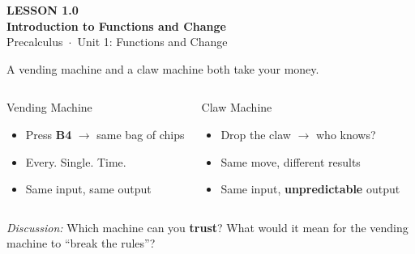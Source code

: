 \documentclass[aspectratio=169, 11pt]{beamer}
\begin{document}
{
\begin{frame}[plain]
  \vspace{2.8cm}\hspace{0.55cm}%
  \begin{minipage}{0.9\textwidth}
    {\color{goldacc}\bfseries\small LESSON 1.0}\\[0.5cm]
    {\color{white}\bfseries\LARGE Introduction to Functions and Change}\\[1.2cm]
    {\color{lilacmid}\small Precalculus~$\cdot$~Unit 1: Functions and Change}
  \end{minipage}
\end{frame}
}

\begin{frame}[t, plain]

  A vending machine and a claw machine both take your money.

  \bigskip
  \begin{columns}[T]
      \begin{block}{Vending Machine}
        \begin{itemize}\setlength{\itemsep}{6pt}
          \item Press \textbf{B4} \(\to\) same bag of chips
          \item Every. Single. Time.
          \item Same input, same output
        \end{itemize}
      \end{block}

      \begin{block}{Claw Machine}
        \begin{itemize}\setlength{\itemsep}{6pt}
          \item Drop the claw \(\to\) who knows?
          \item Same move, different results
          \item Same input, \textbf{unpredictable} output
        \end{itemize}
      \end{block}
  \end{columns}

  \bigskip
  \textit{Discussion:} Which machine can you \textbf{trust}? What would it mean for
  the vending machine to ``break the rules''?
\end{frame}
\end{document}
